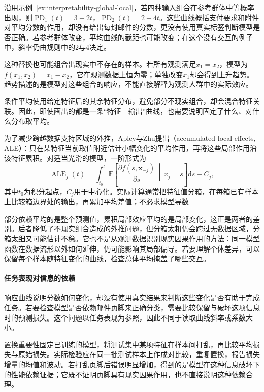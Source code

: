 沿用示例~\ref{ex:interpretability-global-local}，若四种输入组合在参考群体中等概率出现，则$\operatorname{PD}_1(t)=3+2t$，$\operatorname{PD}_2(t)=2+4t$。这些曲线概括支付要求和附件对平均分数的作用，却没有给出每封邮件的分数，更没有使用真实标签判断模型是否正确。若参考群体改变，平均曲线的截距也可能改变；在这个没有交互的例子中，斜率仍由规则中的2与4决定。

这种替换也可能组合出现实中不存在的样本。若所有观测满足$x_1=x_2$，模型为$f(x_1,x_2)=x_1-x_2$，它在观测数据上恒为零；单独改变$x_1$却会得到上升趋势。趋势描述的是模型对这些组合的响应，不能直接解释为观测人群中的实际效应。

条件平均使用给定特征后的其余特征分布，避免部分不现实组合，却会混合特征关联。因此，即使画出的都是一条“特征—输出”曲线，也需要说明固定了什么、对什么分布取平均。

为了减少跨越数据支持区域的外推，Apley与Zhu提出（accumulated local effects, ALE）：只在某特征当前取值附近估计小幅变化的平均作用，再将这些局部作用沿该特征累积。对适当光滑的模型，一阶形式为
\begin{equation}
 \operatorname{ALE}_j(t)
 =\int_{t_0}^{t}
 \mathbb E\!\left[
 \frac{\partial f(s,\bm{x}_{-j})}{\partial s}
 \,\middle|\,x_j=s\right]\mathrm ds-C_j,
 \label{eq:interpretability-ale}
\end{equation}
其中$t_0$为积分起点，$C_j$用于中心化。实际计算通常把特征值分箱，在每箱已有样本上比较箱边界处的输出，再累加平均差值；不必求模型导数

部分依赖平均的是整个预测值，累积局部效应平均的是局部变化，这正是两者的差别。后者降低了不现实组合造成的外推问题，但分箱太粗仍会跨过无数据区域，分箱太细又可能估计不稳。它也不是从观测数据识别现实因果作用的方法：同一模型函数在数据流形以外如何延伸，仍可能影响其局部偏导。若要理解个体差异，可以保留每个样本随特征变化的曲线，检查总体平均掩盖了哪些交互。

\paragraph{任务表现对信息的依赖}

响应曲线说明分数如何变化，却没有使用真实结果来判断这些变化是否有助于完成任务。若要检查模型是否依赖邮件页脚来正确分类，需要比较保留与破坏这项信息时的预测损失。这个问题以任务表现为参照，因此不同于读取曲线斜率或系数大小。

置换重要性固定已训练的模型，将测试集中某项特征在样本间打乱，再比较平均损失与原始损失。实际检验应在同一批测试样本上作成对比较，重复置换，报告损失增量的均值和波动。若打乱页脚后错误明显增加，得到的是模型在这种信息破坏下的性能依赖证据；它既不证明页脚具有现实因果作用，也不直接说明这种依赖合理。

